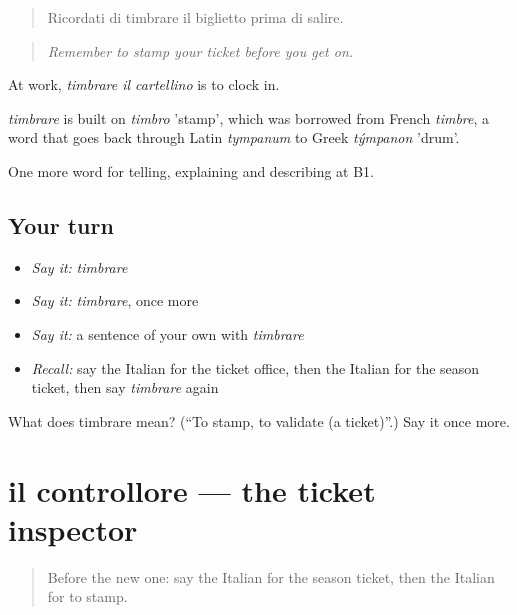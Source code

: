 \begin{quote}
Ricordati di timbrare il biglietto prima di salire.
\end{quote}

\begin{quote}
\emph{Remember to stamp your ticket before you get on.}
\end{quote}

At work, \emph{timbrare il cartellino} is to clock in.

\begin{cousinweb}
\emph{timbrare} is built on \emph{timbro} 'stamp', which was borrowed from French \emph{timbre}, a word that goes back through Latin \emph{tympanum} to Greek \emph{týmpanon} 'drum'.
\end{cousinweb}

\begin{grammarlens}[title={What you've built}]
One more word for telling, explaining and describing at B1.
\end{grammarlens}

\subsection*{Your turn}
\begin{itemize}
\raggedright
  \item \emph{Say it:} \emph{timbrare}
  \item \emph{Say it:} \emph{timbrare}, once more
  \item \emph{Say it:} a sentence of your own with \emph{timbrare}
  \item \emph{Recall:} say the Italian for the ticket office, then the Italian for the season ticket, then say \emph{timbrare} again
\end{itemize}

\begin{tcolorbox}[breakable,colback=teal!4,colframe=teal!35!black,title={Before you move on}]
What does timbrare mean? (\textquotedblleft{}To stamp, to validate (a ticket)\textquotedblright{}.) Say it once more.
\end{tcolorbox}
\section[il controllore]{il controllore — the ticket inspector}

\label{lesson:IT-C418-controllore}



\begin{quote}
Before the new one: say the Italian for the season ticket, then the Italian for to stamp.
\end{quote}

